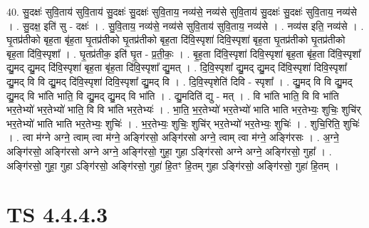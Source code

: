 \documentclass[17pt]{extarticle}
\begin{document}
40. सु॒दक्षः॑ सुवि॒ताय॑ सुवि॒ताय॑ सु॒दक्षः॑ सु॒दक्षः॑ सुवि॒ताय॒ नव्य॑से॒ नव्य॑से सुवि॒ताय॑ सु॒दक्षः॑ सु॒दक्षः॑ सुवि॒ताय॒ नव्य॑से । . सु॒दक्ष॒ इति॑ सु - दक्षः॑ । . सु॒वि॒ताय॒ नव्य॑से॒ नव्य॑से सुवि॒ताय॑ सुवि॒ताय॒ नव्य॑से । . नव्य॑स इति॒ नव्य॑से । . घृ॒तप्र॑तीको बृह॒ता बृ॑ह॒ता घृ॒तप्र॑तीको घृ॒तप्र॑तीको बृह॒ता दि॑वि॒स्पृशा॑ दिवि॒स्पृशा॑ बृह॒ता घृ॒तप्र॑तीको घृ॒तप्र॑तीको बृह॒ता दि॑वि॒स्पृशा᳚ । . घृ॒तप्र॑तीक॒ इति॑ घृ॒त - प्र॒ती॒कः॒ । . बृ॒ह॒ता दि॑वि॒स्पृशा॑ दिवि॒स्पृशा॑ बृह॒ता बृ॑ह॒ता दि॑वि॒स्पृशा᳚ द्यु॒मद् द्यु॒मद् दि॑वि॒स्पृशा॑ बृह॒ता बृ॑ह॒ता दि॑वि॒स्पृशा᳚ द्यु॒मत् । . दि॒वि॒स्पृशा᳚ द्यु॒मद् द्यु॒मद् दि॑वि॒स्पृशा॑ दिवि॒स्पृशा᳚ द्यु॒मद् वि वि द्यु॒मद् दि॑वि॒स्पृशा॑ दिवि॒स्पृशा᳚ द्यु॒मद् वि । . दि॒वि॒स्पृशेति॑ दिवि - स्पृशा᳚ । . द्यु॒मद् वि वि द्यु॒मद् द्यु॒मद् वि भा॑ति भाति॒ वि द्यु॒मद् द्यु॒मद् वि भा॑ति । . द्यु॒मदिति॑ द्यु - मत् । . वि भा॑ति भाति॒ वि वि भा॑ति भर॒तेभ्यो॑ भर॒तेभ्यो॑ भाति॒ वि वि भा॑ति भर॒तेभ्यः॑ । . भा॒ति॒ भ॒र॒तेभ्यो॑ भर॒तेभ्यो॑ भाति भाति भर॒तेभ्यः॒ शुचिः॒ शुचि॑र् भर॒तेभ्यो॑ भाति भाति भर॒तेभ्यः॒ शुचिः॑ । . भ॒र॒तेभ्यः॒ शुचिः॒ शुचि॑र् भर॒तेभ्यो॑ भर॒तेभ्यः॒ शुचिः॑ । . शुचि॒रिति॒ शुचिः॑ । . त्वा म॑ग्ने अग्ने॒ त्वाम् त्वा म॑ग्ने॒ अङ्गि॑रसो॒ अङ्गि॑रसो अग्ने॒ त्वाम् त्वा म॑ग्ने॒ अङ्गि॑रसः । . अ॒ग्ने॒ अङ्गि॑रसो॒ अङ्गि॑रसो अग्ने अग्ने॒ अङ्गि॑रसो॒ गुहा॒ गुहा ऽङ्गि॑रसो अग्ने अग्ने॒ अङ्गि॑रसो॒ गुहा᳚ । . अङ्गि॑रसो॒ गुहा॒ गुहा ऽङ्गि॑रसो॒ अङ्गि॑रसो॒ गुहा॑ हि॒तꣳ हि॒तम् गुहा ऽङ्गि॑रसो॒ अङ्गि॑रसो॒ गुहा॑ हि॒तम् । \newline
\pagebreak
{}

\section{ TS 4.4.4.3 }
\end{document}
